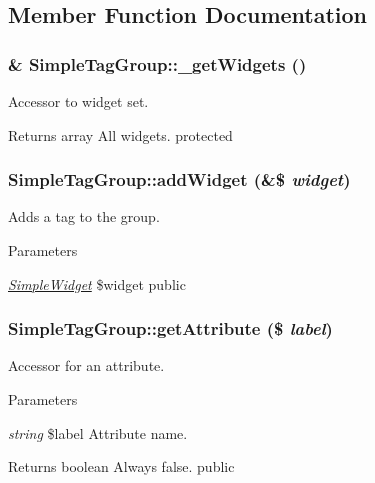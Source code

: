 \subsection{Member Function Documentation}
\hypertarget{class_simple_tag_group_a72480ffb09fe8bad5dac4eeacb02591b}{
\subsubsection[{\_\-getWidgets}]{\setlength{\rightskip}{0pt plus 5cm}\& SimpleTagGroup::\_\-getWidgets ()}}
\label{class_simple_tag_group_a72480ffb09fe8bad5dac4eeacb02591b}
Accessor to widget set. \begin{DoxyReturn}{Returns}
array All widgets.  protected 
\end{DoxyReturn}
\hypertarget{class_simple_tag_group_a37fc41944b1eeb66b1e0255a7fe7bcd8}{
\subsubsection[{addWidget}]{\setlength{\rightskip}{0pt plus 5cm}SimpleTagGroup::addWidget (\&\$ {\em widget})}}
\label{class_simple_tag_group_a37fc41944b1eeb66b1e0255a7fe7bcd8}
Adds a tag to the group. 
\begin{DoxyParams}{Parameters}
\item[{\em \hyperlink{class_simple_widget}{SimpleWidget}}]\$widget  public \end{DoxyParams}
\hypertarget{class_simple_tag_group_a79b75c7101783bb1d620cbc86df36d1e}{
\subsubsection[{getAttribute}]{\setlength{\rightskip}{0pt plus 5cm}SimpleTagGroup::getAttribute (\$ {\em label})}}
\label{class_simple_tag_group_a79b75c7101783bb1d620cbc86df36d1e}
Accessor for an attribute. 
\begin{DoxyParams}{Parameters}
\item[{\em string}]\$label Attribute name. \end{DoxyParams}
\begin{DoxyReturn}{Returns}
boolean Always false.  public 
\end{DoxyReturn}
